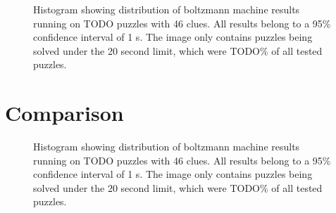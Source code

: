 \documentclass[a4paper,11pt]{kth-mag}
\begin{document}
\begin{figure}[here] 
\noindent{}
\caption{Histogram showing distribution of boltzmann machine results running on TODO puzzles with 46 clues. All results belong to a 95\% confidence interval of 1 s. The image only contains puzzles being solved under the 20 second limit, which were TODO\% of all tested puzzles.}
\label{fig:boltzmannDistribution}
\end{figure}

\FloatBarrier
\section{Comparison}

\begin{figure}[here] 
\noindent{}
\caption{Histogram showing distribution of boltzmann machine results running on TODO puzzles with 46 clues. All results belong to a 95\% confidence interval of 1 s. The image only contains puzzles being solved under the 20 second limit, which were TODO\% of all tested puzzles.}
\label{fig:boltzmannDistribution}
\end{figure}
\end{document}
